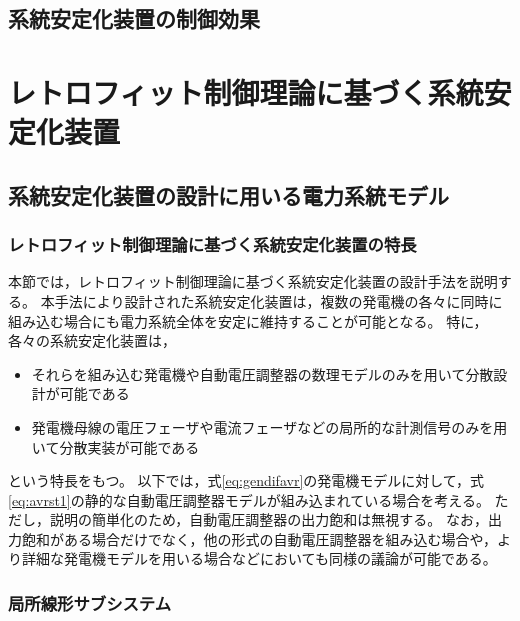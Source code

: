\documentclass[tombow,dvipdfmx]{corona-a5-1.1}
\begin{document}
\subsection{系統安定化装置の制御効果}

\begin{例}[xxx]\label{ex:psseffect}
\end{例}


\section{レトロフィット制御理論に基づく系統安定化装置\advanced}

\subsection{系統安定化装置の設計に用いる電力系統モデル\advanced}

\subsubsection{レトロフィット制御理論に基づく系統安定化装置の特長}

本節では，レトロフィット制御理論に基づく系統安定化装置の設計手法を説明する\cite{ishizaki2018retrofit,sadamoto2018retrofit,sasahara2019damping,ishizaki2019retrofit,ishizaki2021modularity}。
本手法により設計された系統安定化装置は，複数の発電機の各々に同時に組み込む場合にも電力系統全体を安定に維持することが可能となる。
特に，各々の系統安定化装置は，
\begin{itemize}
\item それらを組み込む発電機や自動電圧調整器の数理モデルのみを用いて分散設計が可能である
\item 発電機母線の電圧フェーザや電流フェーザなどの局所的な計測信号のみを用いて分散実装が可能である
\end{itemize}
という特長をもつ。
以下では，式\ref{eq:gendifavr}の発電機モデルに対して，式\ref{eq:avrst1}の静的な自動電圧調整器モデルが組み込まれている場合を考える。
ただし，説明の簡単化のため，自動電圧調整器の出力飽和は無視する。
なお，出力飽和がある場合だけでなく，他の形式の自動電圧調整器を組み込む場合や，より詳細な発電機モデルを用いる場合などにおいても同様の議論が可能である。


\subsubsection{局所線形サブシステム}
\end{document}
